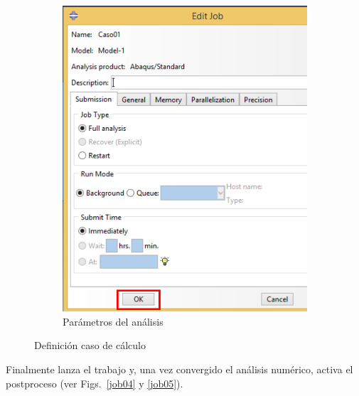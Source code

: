 \begin{figure}[!h]
\begin{subfigure}[!h]{0.44\textwidth}
      \includegraphics[width=\textwidth]{./body/images/job03.pdf}
      \caption{Parámetros del análisis}
      \label{job03}
    \end{subfigure}%
    \caption{Definición caso de cálculo}
  \end{figure}

  Finalmente lanza el trabajo y, una vez convergido el análisis
  numérico, activa el postproceso (ver Figs.~\ref{job04} y
  \ref{job05}).

